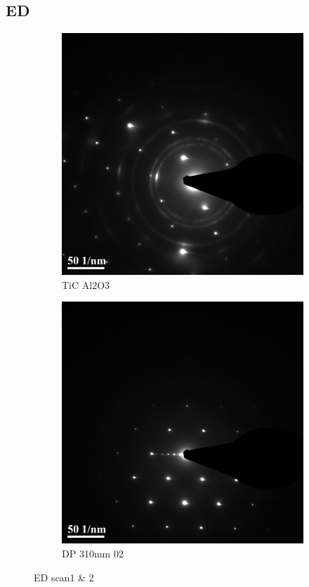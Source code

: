 \subsection{ED}
\begin{figure}[h!]
	\centering
	\begin{subfigure}[b]{0.45\textwidth}
		\includegraphics[width=\textwidth]{./Images/ED/TiC_Al2O3}
		\caption{TiC Al2O3}
		\label{fig:TiC_Al2O3}
	\end{subfigure}
	\begin{subfigure}[b]{0.45\textwidth}
		\includegraphics[width=\textwidth]{./Images/ED/DP_310mm_02}
		\caption{DP 310mm 02}
		\label{fig:DP_310mm_02}
	\end{subfigure}
	\caption{ED scan1 \& 2}
	\label{fig:ED scan1_&_2}
\end{figure}